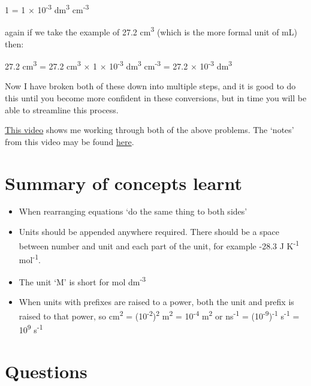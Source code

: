 \documentclass[
]{book}
\providecommand{\tightlist}{%
  \setlength{\itemsep}{0pt}\setlength{\parskip}{0pt}}
\begin{document}
1 = 1 × 10\textsuperscript{-3} dm\textsuperscript{3} cm\textsuperscript{-3}

again if we take the example of 27.2 cm\textsuperscript{3} (which is the more formal unit of mL) then:

27.2 cm\textsuperscript{3} = 27.2 cm\textsuperscript{3} × 1 × 10\textsuperscript{-3} dm\textsuperscript{3} cm\textsuperscript{-3} = 27.2 × 10\textsuperscript{-3} dm\textsuperscript{3}

Now I have broken both of these down into multiple steps, and it is good to do this until you become more confident in these conversions, but in time you will be able to streamline this process.

\href{https://www.youtube.com/embed/8T3FmZ5oJ-s}{This video} shows me working through both of the above problems. The `notes' from this video may be found \href{http://workitoutwithapencil.xyz/wp-content/uploads/2021/07/UnitConversions.pdf}{here}.

\hypertarget{summary-of-concepts-learnt}{%
\section{Summary of concepts learnt}\label{summary-of-concepts-learnt}}

\begin{itemize}
\tightlist
\item
  When rearranging equations `do the same thing to both sides'
\item
  Units should be appended anywhere required. There should be a space between number and unit and each part of the unit, for example -28.3 J K\textsuperscript{-1} mol\textsuperscript{-1}.
\item
  The unit `M' is short for mol dm\textsuperscript{-3}
\item
  When units with prefixes are raised to a power, both the unit and prefix is raised to that power, so cm\textsuperscript{2} = (10\textsuperscript{-2})\textsuperscript{2} m\textsuperscript{2} = 10\textsuperscript{-4} m\textsuperscript{2} or ns\textsuperscript{-1} = (10\textsuperscript{-9})\textsuperscript{-1} s\textsuperscript{-1} = 10\textsuperscript{9} s\textsuperscript{-1}
\end{itemize}

\hypertarget{sec:QuestionsUnits}{%
\section{Questions}\label{sec:QuestionsUnits}}
\end{document}
